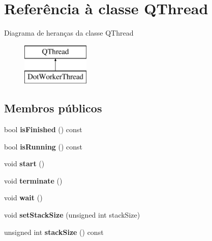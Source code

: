 \hypertarget{class_q_thread}{\section{Referência à classe Q\-Thread}
\label{class_q_thread}
}
Diagrama de heranças da classe Q\-Thread\begin{figure}[H]
\begin{center}
\leavevmode
\includegraphics[height=2.000000cm]{class_q_thread}
\end{center}
\end{figure}
\subsection*{Membros públicos}
\begin{DoxyCompactItemize}
\item 
\hypertarget{class_q_thread_aa75a8d056ba4d5ba219391fcda7a526d}{bool {\bfseries is\-Finished} () const }\label{class_q_thread_aa75a8d056ba4d5ba219391fcda7a526d}

\item 
\hypertarget{class_q_thread_aa514c13c962ad8caf9dbebe84e1f6b1d}{bool {\bfseries is\-Running} () const }\label{class_q_thread_aa514c13c962ad8caf9dbebe84e1f6b1d}

\item 
\hypertarget{class_q_thread_a60de64d75454385b23995437f1d72669}{void {\bfseries start} ()}\label{class_q_thread_a60de64d75454385b23995437f1d72669}

\item 
\hypertarget{class_q_thread_a74a45d2648335936561898c390281a6a}{void {\bfseries terminate} ()}\label{class_q_thread_a74a45d2648335936561898c390281a6a}

\item 
\hypertarget{class_q_thread_aa3b21853f890838c88d047d6c2786917}{void {\bfseries wait} ()}\label{class_q_thread_aa3b21853f890838c88d047d6c2786917}

\item 
\hypertarget{class_q_thread_a219220dc73d90102b5cc1903373487dc}{void {\bfseries set\-Stack\-Size} (unsigned int stack\-Size)}\label{class_q_thread_a219220dc73d90102b5cc1903373487dc}

\item 
\hypertarget{class_q_thread_a0a9a61081b2a6e116116609f04b8efea}{unsigned int {\bfseries stack\-Size} () const }\label{class_q_thread_a0a9a61081b2a6e116116609f04b8efea}

\end{DoxyCompactItemize}
